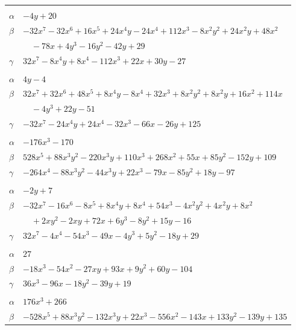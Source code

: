 \documentclass[11pt]{article}
\begin{document}
\begin{longtable}{@{}ll@{}}
\addlinespace[3pt]
\multicolumn{2}{@{}l}{$\{i,j\}=\{37,81\}$, $k_{ij}=3^{2}\cdot 5$}\\
$\alpha$ & $-4y+20$\\
$\beta$ & $-32x^{7}-32x^{6}+16x^{5}+24x^{4}y-24x^{4}+112x^{3}-8x^{2}y^{2}+24x^{2}y+48x^{2}$\\
 & $\quad -78x+4y^{3}-16y^{2}-42y+29$\\
$\gamma$ & $32x^{7}-8x^{4}y+8x^{4}-112x^{3}+22x+30y-27$\\
\addlinespace[3pt]
\multicolumn{2}{@{}l}{$\{i,j\}=\{37,82\}$, $k_{ij}=3^{3}\cdot 11$}\\
$\alpha$ & $4y-4$\\
$\beta$ & $32x^{7}+32x^{6}+48x^{5}+8x^{4}y-8x^{4}+32x^{3}+8x^{2}y^{2}+8x^{2}y+16x^{2}+114x$\\
 & $\quad -4y^{3}+22y-51$\\
$\gamma$ & $-32x^{7}-24x^{4}y+24x^{4}-32x^{3}-66x-26y+125$\\
\addlinespace[3pt]
\multicolumn{2}{@{}l}{$\{i,j\}=\{38,60\}$, $k_{ij}=2^{3}\cdot 3$}\\
$\alpha$ & $-176x^{3}-170$\\
$\beta$ & $528x^{5}+88x^{3}y^{2}-220x^{3}y+110x^{3}+268x^{2}+55x+85y^{2}-152y+109$\\
$\gamma$ & $-264x^{4}-88x^{3}y^{2}-44x^{3}y+22x^{3}-79x-85y^{2}+18y-97$\\
\addlinespace[3pt]
\multicolumn{2}{@{}l}{$\{i,j\}=\{38,75\}$, $k_{ij}=2^{2}\cdot 3^{2}$}\\
$\alpha$ & $-2y+7$\\
$\beta$ & $-32x^{7}-16x^{6}-8x^{5}+8x^{4}y+8x^{4}+54x^{3}-4x^{2}y^{2}+4x^{2}y+8x^{2}$\\
 & $\quad +2xy^{2}-2xy+72x+6y^{3}-8y^{2}+15y-16$\\
$\gamma$ & $32x^{7}-4x^{4}-54x^{3}-49x-4y^{3}+5y^{2}-18y+29$\\
\addlinespace[3pt]
\multicolumn{2}{@{}l}{$\{i,j\}=\{38,87\}$, $k_{ij}=2^{3}$}\\
$\alpha$ & $27$\\
$\beta$ & $-18x^{3}-54x^{2}-27xy+93x+9y^{2}+60y-104$\\
$\gamma$ & $36x^{3}-96x-18y^{2}-39y+19$\\
\addlinespace[3pt]
\multicolumn{2}{@{}l}{$\{i,j\}=\{39,56\}$, $k_{ij}=2^{2}\cdot 3^{3}\cdot 5$}\\
$\alpha$ & $176x^{3}+266$\\
$\beta$ & $-528x^{5}+88x^{3}y^{2}-132x^{3}y+22x^{3}-556x^{2}-143x+133y^{2}-139y+135$\\

\end{longtable}
\end{document}
